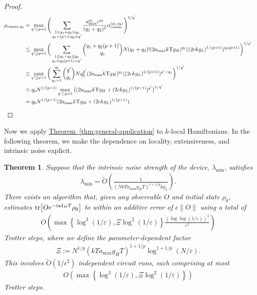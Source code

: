 \documentclass[11pt]{article}
\newtheorem{theorem}{Theorem}
\newcommand{\thm}[1]{\hyperref[thm:#1]{Theorem~\ref*{thm:#1}}}
\renewcommand{\i}{\mathrm{i}}
\newcommand{\ad}{\mathrm{ad}}
\newcommand{\eps}{\varepsilon}
\begin{document}
\begin{proof}
\begin{align*}
        \mu_{\mathrm{comm},q_0} &= \max_{q' \ge p+1} \Bigg(\sum_{\substack{1\le q_1+q_2\le q_0 \\
        q_1+(p+1)q_2 = q'}}\frac{a_{\max}^{q_1}c^{q_2}}{(q_1+q_2)^2} \alpha_{\rm comm}^{(q_1, q_2)}\Bigg)^{1/q'} \\
        &\le \max_{q' \ge p+1} \bigg(\sum_{\substack{1\le q_1+q_2\le q_0 \\
        q_1+q_2(p+1) = q'}}\binom{q_1+q_2(p+1)}{q_1}N(q_1+q_2)!(2a_{\max}k\Upsilon g_H)^{q_1}((2ckg_L)^{1/(p+1)})^{q_2(p+1)}\bigg)^{1/q'}\\
        &\le \max_{q' \ge p+1} \bigg(\sum_{q_1=1}^{q_0}\binom{q'}{q_1}Nq_0^{q'}(2a_{\max}k\Upsilon g_H)^{q_1}((2ckg_L)^{1/(p+1)})^{q'-q_1}\bigg)^{1/q'}\\
        &\le q_0N^{1/(p+1)}\max_{q'\ge p+1} \big((2a_{\max}k\Upsilon g_H+(2ckg_L)^{1/(p+1)})^{q'}\big)^{1/q'}\\
        &=q_0N^{1/(p+1)}(2a_{\max}k\Upsilon g_H+(2ckg_L)^{1/(p+1)}).
    \end{align*}
\end{proof}

Now we apply \thm{general-application} to $k$-local Hamiltonians. In the following theorem, we make the dependence on locality, extensiveness, and intrinsic noise explicit.  
\begin{theorem}
\label{thm:extrapolation-k-local}
    Suppose that the intrinsic noise strength of the device, $\lambda_{\min}$, satisfies
    \begin{align}
    \label{eq:cond-lambda}
        \lambda_{\min} = \widetilde{O}\left(\frac{1}{(Nk\Upsilon a_{\max}g_HT)^{1+1/p} kg_L}\right).
    \end{align} 
    There exists an algorithm that, given any observable $O$ and initial state $\rho_0$, estimates $\tr[O e^{-\i \ad_H T}\rho_0]$ to within an additive error of $\epsilon\|O\|$ using a total of 
    \begin{align*}
        O\left( \max\left\{\log^3(1/\eps), \Xi \log^2(1/\eps)\right\} \frac{(\log\log (1/\eps))^3}{\eps^2} \right)
    \end{align*}
    Trotter steps, where we define the parameter-dependent factor
    \begin{align*}
        \Xi := N^{1/p}(k\Upsilon a_{\max} g_H T)^{1+1/p} \log^{1+1/p}(N/\eps).
    \end{align*}
    This involves $\widetilde{O}(1/\epsilon^2)$ independent circuit runs, each comprising at most
    \begin{align*}
        O\left( \max\left\{\log^3(1/\eps), \Xi \log^2(1/\eps)\right\} \right)
    \end{align*}
    Trotter steps.
\end{theorem}
\end{document}

